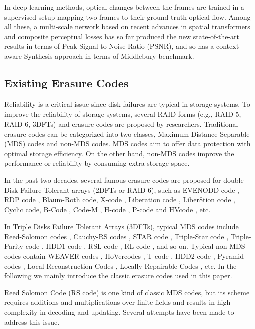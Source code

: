 \documentclass[sigconf]{acmart}
\begin{document}
In deep learning methods, optical changes between the frames are trained in a supervised setup mapping two frames to their ground truth optical flow. Among all these, a multi-scale network\cite{van2017frame} based on recent advances in spatial transformers and composite perceptual losses has so far produced the new state-of-the-art results in terms of Peak Signal to Noise Ratio (PSNR), and so has a context-aware Synthesis approach\cite{niklaus2018context} in terms of Middlebury benchmark.

\subsection{Existing Erasure Codes}\label{existEC}

Reliability is a critical issue since disk failures are typical in storage systems. To improve the reliability of storage systems, several RAID forms (e.g., RAID-5, RAID-6, 3DFTs) and erasure codes are proposed by researchers.  Traditional erasure codes can be categorized into two classes, Maximum Distance Separable (MDS) codes and non-MDS codes. MDS codes aim to offer data protection with optimal storage efficiency. On the other hand, non-MDS codes improve the performance or reliability by consuming extra storage space.

In the past two decades, several famous erasure codes are proposed for double Disk Failure Tolerant arrays (2DFTs or RAID-6), such as EVENODD code \cite{EVENODD}, RDP code \cite{RDP}, Blaum-Roth code\cite{BlaumRoth}, X-code \cite{XCode}, Liberation code \cite{Liberation}, Liber8tion code \cite{Liber8tion}, Cyclic \cite {Cyclic} code, B-Code \cite{BCode}, Code-M \cite{Code-M}, H-code \cite{hcode}, P-code \cite{PCode} and HVcode \cite{HVCode}, etc.

In Triple Disks Failure Tolerant Arrays (3DFTs), typical MDS codes include Reed-Solomon codes \cite{RS}, Cauchy-RS codes \cite{CRS}, STAR code \cite{STAR}, Triple-Star code \cite{TripleStar}, Triple-Parity code \cite{TPtech}, HDD1 code \cite{HDD}, RSL-code \cite{RSL}, RL-code \cite{RL}, and so on. Typical non-MDS codes contain WEAVER codes \cite{WEAVER}, HoVercodes \cite{HoVer}, T-code \cite{TCode}, HDD2 code \cite{HDD}, Pyramid codes \cite{Pyramid}, Local Reconstruction Codes \cite{LRC}, Locally Repairable Codes \cite{XORing}, etc.
In the following we mainly introduce the classic erasure codes used in this paper.

Reed Solomon Code \cite{RS} (RS code) is one kind of classic MDS codes, but its scheme requires additions and multiplications over finite fields and results in high complexity in decoding and updating. Several attempts have been made to address this issue.
\end{document}
